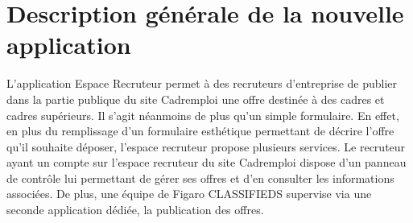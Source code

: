 \section{Description générale de la nouvelle application}
\label{sec:Description generale de l'application}
L'application Espace Recruteur permet à des recruteurs d'entreprise de publier dans la partie publique du site Cadremploi une offre destinée à des cadres et cadres supérieurs.
Il s'agit néanmoins de plus qu'un simple formulaire.
En effet, en plus du remplissage d'un formulaire esthétique permettant de décrire l'offre qu'il souhaite déposer, l'espace recruteur propose plusieurs services.
Le recruteur ayant un compte sur l'espace recruteur du site Cadremploi dispose d'un panneau de contrôle lui permettant de gérer ses offres et d'en consulter les informations associées.
De plus, une équipe de Figaro CLASSIFIEDS supervise via une seconde application dédiée, la publication des offres.

